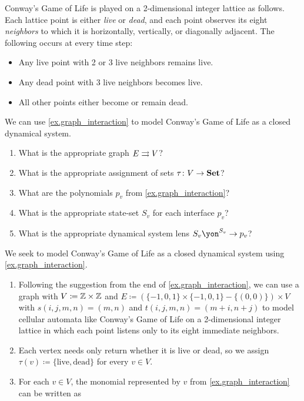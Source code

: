 \documentclass[Book-Poly]{subfiles}
\begin{document}
\begin{exercise}\label{exc.conway}
Conway's Game of Life is played on a 2-dimensional integer lattice as follows.
Each lattice point is either \emph{live} or \emph{dead}, and each point observes its eight \emph{neighbors} to which it is horizontally, vertically, or diagonally adjacent.
The following occurs at every time step:
\begin{itemize}
    \item Any live point with 2 or 3 live neighbors remains live.
    \item Any dead point with 3 live neighbors becomes live.
    \item All other points either become or remain dead.
\end{itemize}
We can use \cref{ex.graph_interaction} to model Conway's Game of Life as a closed dynamical system.
\begin{enumerate}
	\item What is the appropriate graph $E\rightrightarrows V$?
	\item What is the appropriate assignment of sets $\tau\colon V\to\mathbf{Set}$?
	\item What are the polynomials $p_v$ from \cref{ex.graph_interaction}?
	\item What is the appropriate state-set $S_v$ for each interface $p_v$?
	\item What is the appropriate dynamical system lens $S_v\yon^{S_v}\to p_v$?
\qedhere
\end{enumerate}
\begin{solution}
We seek to model Conway's Game of Life as a closed dynamical system using \cref{ex.graph_interaction}.
\begin{enumerate}
    \item Following the suggestion from the end of \cref{ex.graph_interaction}, we can use a graph with $V\coloneq\mathbb{Z}\times\mathbb{Z}$ and $E\coloneqq(\{-1,0,1\}\times\{-1,0,1\}-\{(0,0)\})\times V$ with $s(i,j,m,n)=(m,n)$ and $t(i,j,m,n)=(m+i,n+j)$ to model cellular automata like Conway's Game of Life on a 2-dimensional integer lattice in which each point listens only to its eight immediate neighbors.
    \item Each vertex needs only return whether it is live or dead, so we assign $\tau(v)\coloneqq\{\text{live},\text{dead}\}$ for every $v\in V$.
    \item For each $v\in V$, the monomial represented by $v$ from \cref{ex.graph_interaction} can be written as

\end{enumerate}
\end{solution}
\end{exercise}
\end{document}
